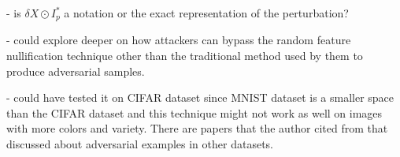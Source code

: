 \documentclass[a4paper,10pt]{article}
\theoremstyle{definition}
\begin{document}
- is $\delta X \odot I_p^\ast$ a notation or the exact representation of the perturbation?




- could explore deeper on how attackers can bypass the random feature nullification technique other than the traditional method used by them to produce adversarial samples.

- could have tested it on CIFAR dataset since MNIST dataset is a smaller space than the CIFAR dataset and this technique might not work as well on images with more colors and variety. There are papers that the author cited from that discussed about adversarial examples in other datasets.
\newpage

 

\end{document}

